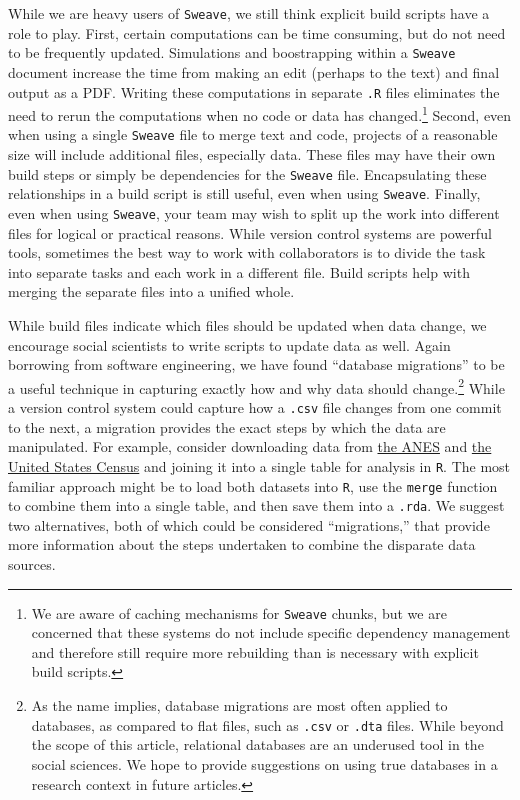 \documentclass[]{article}
\begin{document}
While we are heavy users of \texttt{Sweave}, we still think explicit build
scripts have a role to play. First, certain computations can be time
consuming, but do not need to be frequently updated. Simulations and
boostrapping within a \texttt{Sweave} document increase the time from making
an edit (perhaps to the text) and final output as a PDF. Writing these
computations in separate \texttt{.R} files eliminates the need to rerun the
computations when no code or data has changed.\footnote{We are aware of caching
mechanisms for \texttt{Sweave} chunks, but we are concerned that these systems
do not include specific dependency management and therefore still require more
rebuilding than is necessary with explicit build scripts.} Second, even when
using a single \texttt{Sweave} file to merge text and code, projects of a
reasonable size will include additional files, especially data. These files
may have their own build steps or simply be dependencies for the
\texttt{Sweave} file. Encapsulating these relationships in a build script is
still useful, even when using \texttt{Sweave}. Finally, even when using
\texttt{Sweave}, your team may wish to split up the work into different files
for logical or practical reasons. While version control systems are powerful
tools, sometimes the best way to work with collaborators is to divide the task
into separate tasks and each work in a different file. Build scripts help with
merging the separate files into a unified whole.

While build files indicate which files should be updated when data change, we
encourage social scientists to write scripts to update data as well. Again
borrowing from software engineering, we have found ``database migrations'' to
be a useful technique in capturing exactly how and why data should
change.\footnote{As the name implies, database migrations are most often
applied to databases, as compared to flat files, such as \texttt{.csv} or
\texttt{.dta} files. While beyond the scope of this article, relational databases 
are an
underused tool in the social sciences. We hope to provide suggestions on using
true databases in a research context in future articles.}
While a version control system could capture how a \texttt{.csv} file changes
from one commit to the next, a migration provides the exact steps by which the
data are manipulated. For example, consider downloading data from \href{http://
electionstudies.org}{the
ANES} and \href{http://www.census.gov}{the United States
Census} and joining it into a single table for analysis
in \texttt{R}. The most familiar approach might be to load both datasets into
\texttt{R}, use the \texttt{merge} function to combine them into a single
table, and then save them into a \texttt{.rda}. We suggest two alternatives,
both of which could be considered ``migrations,'' that provide more
information about the steps undertaken to combine the disparate data sources.
\end{document}
